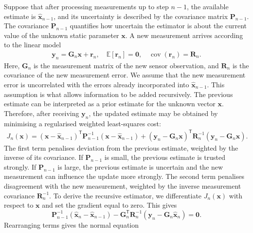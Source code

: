\documentclass[11pt,oneside,openany]{book}
\begin{document}
Suppose that after processing measurements up to step $n-1$, the available estimate is $\widehat{\mathbf{x}}_{n-1}$, and its uncertainty is described by the covariance matrix $\mathbf{P}_{n-1}$. The covariance $\mathbf{P}_{n-1}$ quantifies how uncertain the estimator is about the current value of the unknown static parameter $\mathbf{x}$. A new measurement arrives according to the linear model
\begin{align*}
\mathbf{y}_n
=
\mathbf{G}_n\mathbf{x}
+
\mathbf{r}_n,
\quad
\mathbb{E}[\mathbf{r}_n]=\mathbf{0},
\quad
\operatorname{cov}(\mathbf{r}_n)=\mathbf{R}_n.
\end{align*}
Here, $\mathbf{G}_n$ is the measurement matrix of the new sensor observation, and $\mathbf{R}_n$ is the covariance of the new measurement error. We assume that the new measurement error is uncorrelated with the errors already incorporated into $\widehat{\mathbf{x}}_{n-1}$. This assumption is what allows information to be added recursively. The previous estimate can be interpreted as a prior estimate for the unknown vector $\mathbf{x}$. Therefore, after receiving $\mathbf{y}_n$, the updated estimate may be obtained by minimising a regularised weighted least-squares cost:
\begin{align}
J_n(\mathbf{x})
=
\left(
\mathbf{x}
-
\widehat{\mathbf{x}}_{n-1}
\right)^{\mathsf T}
\mathbf{P}_{n-1}^{-1}
\left(
\mathbf{x}
-
\widehat{\mathbf{x}}_{n-1}
\right) +
\left(
\mathbf{y}_n
-
\mathbf{G}_n\mathbf{x}
\right)^{\mathsf T}
\mathbf{R}_n^{-1}
\left(
\mathbf{y}_n
-
\mathbf{G}_n\mathbf{x}
\right). \nonumber
\end{align}
The first term penalises deviation from the previous estimate, weighted by the inverse of its covariance. If $\mathbf{P}_{n-1}$ is small, the previous estimate is trusted strongly. If $\mathbf{P}_{n-1}$ is large, the previous estimate is uncertain and the new measurement can influence the update more strongly. The second term penalises disagreement with the new measurement, weighted by the inverse measurement covariance $\mathbf{R}_n^{-1}$. To derive the recursive estimator, we differentiate $J_n(\mathbf{x})$ with respect to $\mathbf{x}$ and set the gradient equal to zero. This gives
\begin{equation}
\mathbf{P}_{n-1}^{-1}
\left(
\widehat{\mathbf{x}}_n
-
\widehat{\mathbf{x}}_{n-1}
\right)
-
\mathbf{G}_n^{\mathsf T}
\mathbf{R}_n^{-1}
\left(
\mathbf{y}_n
-
\mathbf{G}_n
\widehat{\mathbf{x}}_n
\right)
=
\mathbf{0}.
\end{equation}
Rearranging terms gives the normal equation
\end{document}
